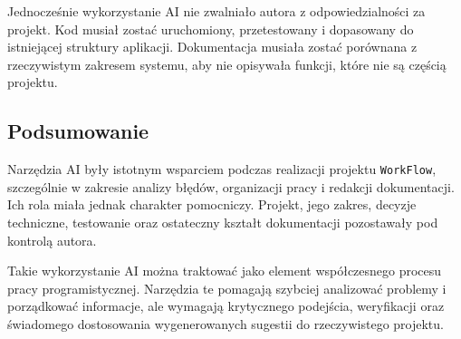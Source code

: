 Jednocześnie wykorzystanie AI nie zwalniało autora z odpowiedzialności za projekt. Kod musiał zostać uruchomiony, przetestowany i dopasowany do istniejącej struktury aplikacji. Dokumentacja musiała zostać porównana z rzeczywistym zakresem systemu, aby nie opisywała funkcji, które nie są częścią projektu.

\subsection{Podsumowanie}

Narzędzia AI były istotnym wsparciem podczas realizacji projektu \texttt{WorkFlow}, szczególnie w zakresie analizy błędów, organizacji pracy i redakcji dokumentacji. Ich rola miała jednak charakter pomocniczy. Projekt, jego zakres, decyzje techniczne, testowanie oraz ostateczny kształt dokumentacji pozostawały pod kontrolą autora.

Takie wykorzystanie AI można traktować jako element współczesnego procesu pracy programistycznej. Narzędzia te pomagają szybciej analizować problemy i porządkować informacje, ale wymagają krytycznego podejścia, weryfikacji oraz świadomego dostosowania wygenerowanych sugestii do rzeczywistego projektu.